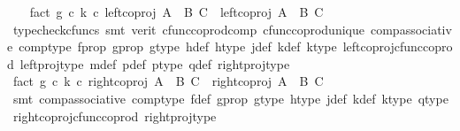 \begin{isabellebody}
\ \ \isamarkupfalse%
\ fact{}{\isacharcolon}{\kern0pt}\ {\isachardoublequoteopen}{\isacharparenleft}{\kern0pt}g\ {\isasymcirc}\isactrlsub c\ k{\isacharparenright}{\kern0pt}\ {\isasymcirc}\isactrlsub c\ {\isacharparenleft}{\kern0pt}left{\isacharunderscore}{\kern0pt}coproj\ {\isacharparenleft}{\kern0pt}A\ {\isasymCoprod}\ B{\isacharparenright}{\kern0pt}\ C{\isacharparenright}{\kern0pt}\ {\isacharequal}{\kern0pt}\ {\isacharparenleft}{\kern0pt}left{\isacharunderscore}{\kern0pt}coproj\ {\isacharparenleft}{\kern0pt}A\ {\isasymCoprod}\ B{\isacharparenright}{\kern0pt}\ C{\isacharparenright}{\kern0pt}{\isachardoublequoteclose}\isanewline
\ \ \ \ \isamarkupfalse%
\ {\isacharparenleft}{\kern0pt}typecheck{\isacharunderscore}{\kern0pt}cfuncs{\isacharcomma}{\kern0pt}\ smt\ {\isacharparenleft}{\kern0pt}verit{\isacharparenright}{\kern0pt}\ cfunc{\isacharunderscore}{\kern0pt}coprod{\isacharunderscore}{\kern0pt}comp\ cfunc{\isacharunderscore}{\kern0pt}coprod{\isacharunderscore}{\kern0pt}unique\ comp{\isacharunderscore}{\kern0pt}associative{}\ comp{\isacharunderscore}{\kern0pt}type\ f{\isacharunderscore}{\kern0pt}prop\ g{\isacharunderscore}{\kern0pt}prop\ g{\isacharunderscore}{\kern0pt}type\ h{\isacharunderscore}{\kern0pt}def\ h{\isacharunderscore}{\kern0pt}type\ j{\isacharunderscore}{\kern0pt}def\ k{\isacharunderscore}{\kern0pt}def\ k{\isacharunderscore}{\kern0pt}type\ left{\isacharunderscore}{\kern0pt}coproj{\isacharunderscore}{\kern0pt}cfunc{\isacharunderscore}{\kern0pt}coprod\ left{\isacharunderscore}{\kern0pt}proj{\isacharunderscore}{\kern0pt}type\ m{\isacharunderscore}{\kern0pt}def\ p{\isacharunderscore}{\kern0pt}def\ p{\isacharunderscore}{\kern0pt}type\ q{\isacharunderscore}{\kern0pt}def\ right{\isacharunderscore}{\kern0pt}proj{\isacharunderscore}{\kern0pt}type{\isacharparenright}{\kern0pt}\isanewline
\ \ \isamarkupfalse%
\ fact{}{\isacharcolon}{\kern0pt}\ {\isachardoublequoteopen}{\isacharparenleft}{\kern0pt}g\ {\isasymcirc}\isactrlsub c\ k{\isacharparenright}{\kern0pt}\ {\isasymcirc}\isactrlsub c\ {\isacharparenleft}{\kern0pt}right{\isacharunderscore}{\kern0pt}coproj\ {\isacharparenleft}{\kern0pt}A\ {\isasymCoprod}\ B{\isacharparenright}{\kern0pt}\ C{\isacharparenright}{\kern0pt}\ {\isacharequal}{\kern0pt}\ {\isacharparenleft}{\kern0pt}right{\isacharunderscore}{\kern0pt}coproj\ {\isacharparenleft}{\kern0pt}A\ {\isasymCoprod}\ B{\isacharparenright}{\kern0pt}\ C{\isacharparenright}{\kern0pt}{\isachardoublequoteclose}\isanewline
\ \ \ \ \isamarkupfalse%
\ {\isacharparenleft}{\kern0pt}smt\ comp{\isacharunderscore}{\kern0pt}associative{}\ comp{\isacharunderscore}{\kern0pt}type\ f{\isacharunderscore}{\kern0pt}def\ g{\isacharunderscore}{\kern0pt}prop\ g{\isacharunderscore}{\kern0pt}type\ h{\isacharunderscore}{\kern0pt}type\ j{\isacharunderscore}{\kern0pt}def\ k{\isacharunderscore}{\kern0pt}def\ k{\isacharunderscore}{\kern0pt}type\ q{\isacharunderscore}{\kern0pt}type\ right{\isacharunderscore}{\kern0pt}coproj{\isacharunderscore}{\kern0pt}cfunc{\isacharunderscore}{\kern0pt}coprod\ right{\isacharunderscore}{\kern0pt}proj{\isacharunderscore}{\kern0pt}type{\isacharparenright}{\kern0pt}\isanewline

\end{isabellebody}
